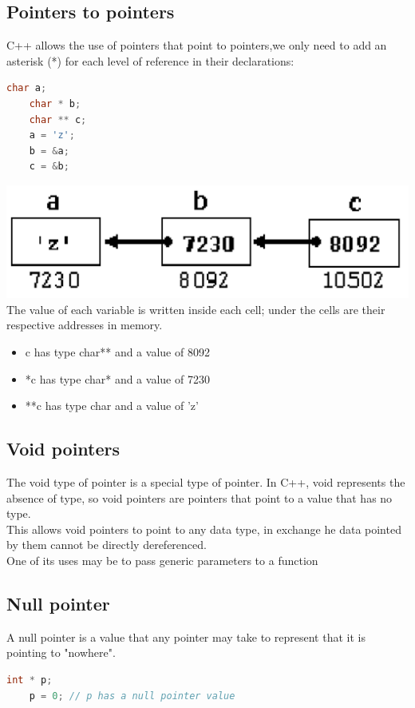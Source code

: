 \documentclass[12pt,oneside]{book}
\begin{document}
\subsection{Pointers to pointers }
C++ allows the use of pointers that point to pointers,we only need to add an asterisk (*) for each level of reference in their declarations:
\begin{lstlisting}[language=C++]
    char a; 
    char * b; 
    char ** c;
    a = 'z'; 
    b = &a; 
    c = &b; 
\end{lstlisting}
\begin{center}
	\includegraphics[width=0.5\linewidth]{../pic/3316/34.png}\\
	{\tiny The value of each variable is written inside each cell; under the cells are their respective addresses in memory.}
\end{center}
\begin{itemize}
	\item c has type char** and a value of 8092
	\item *c has type char* and a value of 7230
	\item **c has type char and a value of 'z'
\end{itemize}
\subsection{Void pointers}
The void type of pointer is a special type of pointer. In C++, void represents the absence of type, so void pointers are pointers that point to a value that has no type.\\
This allows void pointers to point to any data type, in exchange he data pointed by them cannot be directly dereferenced.\\
One of its uses may be to pass generic parameters to a function
\subsection{Null pointer}
A null pointer is a value that any pointer may take to represent that it is pointing to "nowhere".
\begin{lstlisting}[language=C++]
    int * p; 
    p = 0; // p has a null pointer value
\end{lstlisting}
\end{document}
